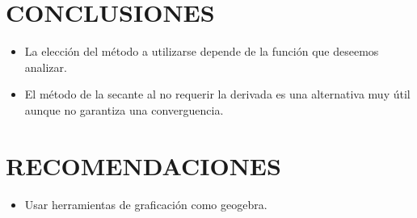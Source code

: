 \documentclass[12pt]{article}
\begin{document}
\section*{CONCLUSIONES}
\begin{itemize}
    \item {La elección del método a utilizarse depende de la función que deseemos analizar.}
    \item {El método de la secante al no requerir la derivada es una alternativa muy útil aunque no garantiza una converguencia.} 
\end{itemize}

\section*{RECOMENDACIONES}

\begin{itemize}
    \item Usar herramientas de graficación como geogebra.
\end{itemize}

\renewcommand{\refname}{\MakeUppercase{REFERENCIAS}}


\end{document}

